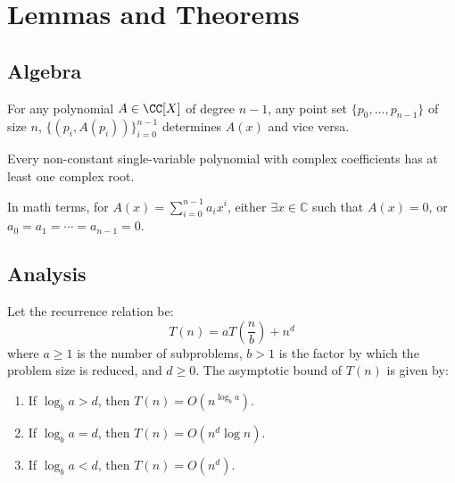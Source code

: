 \part{Lemmas and Theorems}

\chapter{Algebra}

\begin{theorem}
	\label{lem:interpolation}
	For any polynomial \( A \in \CC[X] \) of degree \( n-1 \), any point set \( \{p_0, \ldots, p_{n-1}\} \) of size \( n \), \( \{(p_i, A(p_i))\}_{i=0}^{n-1} \) determines \( A(x) \) and vice versa.
\end{theorem}

\begin{theorem}
	\label{thm:fundamental-algebra}
	Every non-constant single-variable polynomial with complex coefficients has at least one complex root.

	In math terms, for $A(x) = \sum_{i=0}^{n-1} a_i x^i$, either $\exists x \in \mathbb C$ such that $A(x) = 0$, or $a_0 = a_1 = \cdots = a_{n-1} = 0$.
\end{theorem}

\chapter{Analysis}

\begin{theorem}
	\label{lem:master-sim}
	Let the recurrence relation be:
	\[ T(n) = aT\left(\frac{n}{b}\right) + n^d \]
	where $a \ge 1$ is the number of subproblems, $b > 1$ is the factor by which the problem size is reduced, and $d \ge 0$. The asymptotic bound of $T(n)$ is given by:

	\begin{enumerate}
		\item If $\log_b a > d$, then $T(n) = O(n^{\log_b a})$.
		\item If $\log_b a = d$, then $T(n) = O(n^d \log n)$.
		\item If $\log_b a < d$, then $T(n) = O(n^d)$.
	\end{enumerate}
\end{theorem}

